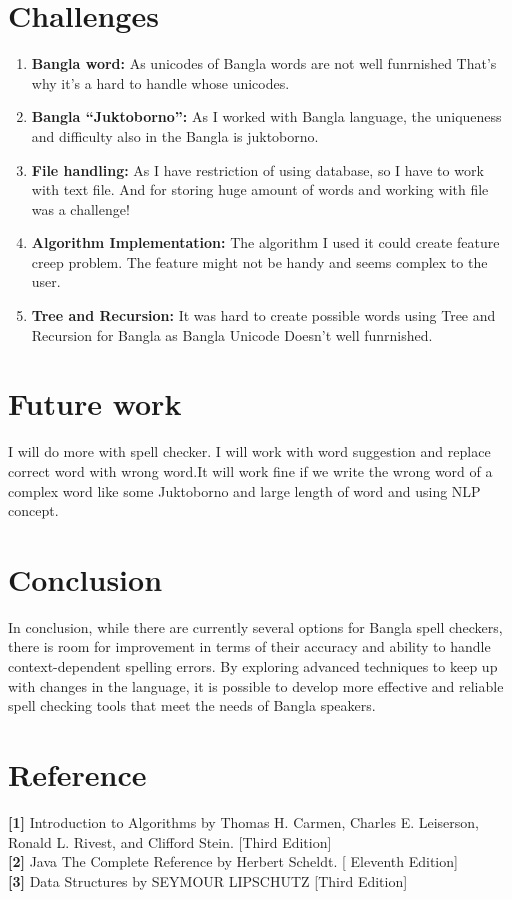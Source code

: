 \documentclass[12pt,letterpaper]{article}
\begin{document}
\begin{flushleft}
\section{Challenges}
\begin{enumerate}
\item  \textbf{Bangla word:} As unicodes of Bangla words are not well funrnished That’s why it’s a 
hard to handle whose unicodes.
\item  \textbf{Bangla “Juktoborno”:} As I worked with Bangla language, the uniqueness and 
difficulty also in the Bangla is juktoborno.
\item  \textbf{File handling:} As I have restriction of using database, so I have to work with text file. 
And for storing huge amount of words and working with file was a challenge!
\item  \textbf{Algorithm Implementation:} The algorithm I used it could create feature creep problem. 
The feature might not be handy and seems complex to the user.
\item \textbf{Tree and Recursion:} It was hard to create possible words using Tree and Recursion 
for Bangla as Bangla Unicode Doesn’t well funrnished.
\end{enumerate}
\section{Future work}
I will do more with spell checker. I will work with word suggestion and replace 
correct word with wrong word.It will work fine if we write the wrong word of a complex word like 
some Juktoborno and large length of word and using NLP concept.
\section{Conclusion}
In conclusion, while there are currently several options for Bangla spell checkers, there is room for improvement in terms of their accuracy and ability to handle context-dependent spelling errors. By exploring advanced techniques to keep up with changes in the language, it is possible to develop more effective and reliable spell checking tools that meet the needs of Bangla speakers.
\section{Reference}
\textbf{[1]} Introduction to Algorithms by Thomas H. Carmen, Charles E. Leiserson, Ronald L. Rivest, and
Clifford Stein. [Third Edition]\\
\textbf{[2]} Java The Complete Reference by Herbert Scheldt. [ Eleventh Edition]\\
\textbf{[3]} Data Structures by SEYMOUR LIPSCHUTZ [Third Edition]
\end{flushleft}
\end{document}
